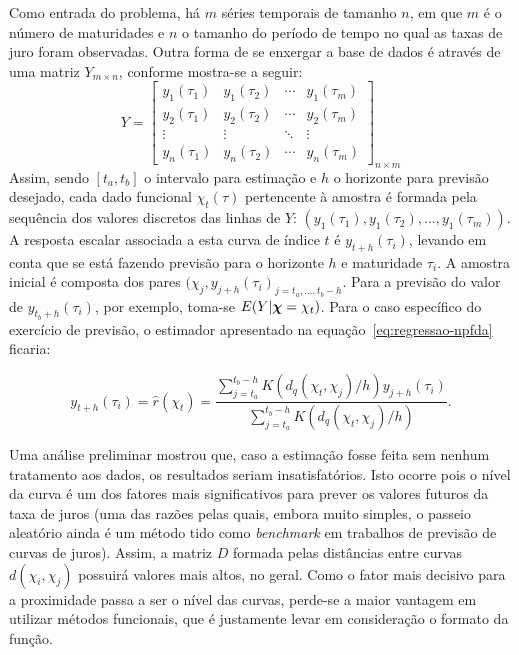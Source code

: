 \documentclass[
	12pt,				%
	openright,			%
	oneside,			%
	a4paper,			%
	english,			%
	brazil				%
	]{dissertacao-ufrgs-abntex2}
\begin{document}
Como entrada do problema, há $m$ séries temporais de tamanho $n$, em que $m$ é o número de maturidades e $n$ o tamanho do período de tempo no qual as taxas de juro foram observadas. Outra forma de se enxergar a base de dados é através de uma matriz $Y_{m \times n}$, conforme mostra-se a seguir:
\begin{equation} \label{eq:matriz-y}
Y = 
 \begin{bmatrix}
	  y_1(\tau_1) & y_1(\tau_2) & \cdots & y_1(\tau_m) \\
	  y_2(\tau_1) & y_2(\tau_2) & \cdots & y_2(\tau_m) \\
	  \vdots  & \vdots  & \ddots & \vdots  \\
	  y_n(\tau_1) & y_n(\tau_2) & \cdots & y_n(\tau_m)
 \end{bmatrix}_{n \times m}
\end{equation}
Assim, sendo $[t_a,t_b]$ o intervalo para estimação e $h$ o horizonte para previsão desejado, cada dado funcional $\chi_t(\tau)$ pertencente à amostra é formada pela sequência dos valores discretos das linhas de $Y$: $\left( y_1(\tau_1), y_1(\tau_2), ..., y_1(\tau_m) \right)$. 
A resposta escalar associada a esta curva de índice $t$ é $y_{t + h}(\tau_i)$, levando em conta que se está fazendo previsão para o horizonte $h$ e maturidade $\tau_i$. A amostra inicial é composta dos pares $(\chi_j,y_{j+h}(\tau_i)_{j=t_a,...,t_b-h}$. Para a previsão do valor de $y_{t_b+h}(\tau_i)$, por exemplo, toma-se $E(Y|\boldsymbol{\chi}=\chi_t)$. Para o caso específico do exercício de previsão, o estimador apresentado na equação~\ref{eq:regressao-npfda} ficaria:

\begin{equation}
y_{t+h}(\tau_i)=\hat{r}(\chi_t) = 
\frac
	{\sum \limits_{j=t_a}^{t_b-h} K(d_{q}(\chi_t,\chi_j)/h)y_{j+h}(\tau_i)}
	{\sum \limits_{j=t_a}^{t_b-h}K(d_{q}(\chi_t,\chi_j)/h)}.
\end{equation}


Uma análise preliminar mostrou que, caso a estimação fosse feita sem nenhum tratamento aos dados, os resultados seriam insatisfatórios. Isto ocorre pois o nível da curva é um dos fatores mais significativos para prever os valores futuros da taxa de juros (uma das razões pelas quais, embora muito simples, o passeio aleatório ainda é um método tido como \emph{benchmark} em trabalhos de previsão de curvas de juros). Assim, a matriz $D$ formada pelas distâncias entre curvas $d(\chi_i,\chi_j)$ possuirá valores mais altos, no geral. Como o fator mais decisivo para a proximidade passa a ser o nível das curvas, perde-se a maior vantagem em utilizar métodos funcionais, que é justamente levar em consideração o formato da função.
\end{document}
